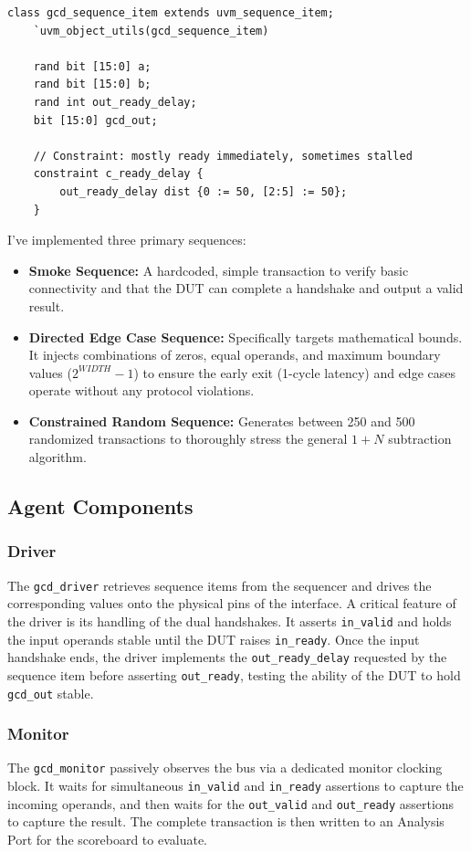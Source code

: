 \begin{verbatim}
class gcd_sequence_item extends uvm_sequence_item;
    `uvm_object_utils(gcd_sequence_item)

    rand bit [15:0] a;
    rand bit [15:0] b;
    rand int out_ready_delay;
    bit [15:0] gcd_out;

    // Constraint: mostly ready immediately, sometimes stalled
    constraint c_ready_delay {
        out_ready_delay dist {0 := 50, [2:5] := 50};
    }
\end{verbatim}

I've implemented three primary sequences:
\begin{itemize}
    \item \textbf{Smoke Sequence:} A hardcoded, simple transaction to verify basic connectivity and that the DUT can complete a handshake and output a valid result.
    \item \textbf{Directed Edge Case Sequence:} Specifically targets mathematical bounds. It injects combinations of zeros, equal operands, and maximum boundary values ($2^{WIDTH}-1$) to ensure the early exit (1-cycle latency) and edge cases operate without any protocol violations.
    \item \textbf{Constrained Random Sequence:} Generates between 250 and 500 randomized transactions to thoroughly stress the general $1+N$ subtraction algorithm.
\end{itemize}

\subsection{Agent Components}
\subsubsection{Driver}
The \texttt{gcd\_driver} retrieves sequence items from the sequencer and drives the corresponding values onto the physical pins of the interface. A critical feature of the driver is its handling of the dual handshakes. It asserts \texttt{in\_valid} and holds the input operands stable until the DUT raises \texttt{in\_ready}. Once the input handshake ends, the driver implements the \texttt{out\_ready\_delay} requested by the sequence item before asserting \texttt{out\_ready}, testing the ability of the DUT to hold \texttt{gcd\_out} stable.

\subsubsection{Monitor}
The \texttt{gcd\_monitor} passively observes the bus via a dedicated monitor clocking block. It waits for simultaneous \texttt{in\_valid} and \texttt{in\_ready} assertions to capture the incoming operands, and then waits for the \texttt{out\_valid} and \texttt{out\_ready} assertions to capture the result. The complete transaction is then written to an Analysis Port for the scoreboard to evaluate.

